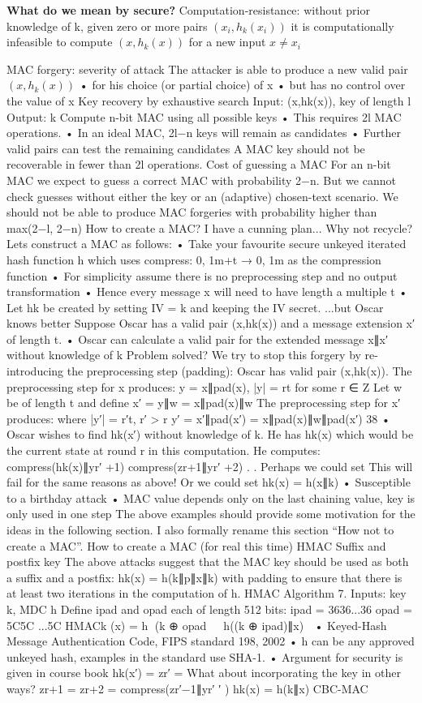 \textbf{What do we mean by secure?}
Computation-resistance:
without prior knowledge of k, given zero or more pairs
$(x_i,h_k(x_i))$ it is computationally infeasible to compute $(x,h_k(x))$ for a new input $x \neq x_i$

MAC forgery: severity of attack
The attacker is able to produce a new valid pair $(x,h_k(x))$
• for his choice (or partial choice) of x
• but has no control over the value of x
Key recovery by exhaustive search
Input: (x,hk(x)), key of length l Output: k
Compute n-bit MAC using all possible keys
• This requires 2l MAC operations.
• In an ideal MAC, 2l−n keys will remain as candidates • Further valid pairs can test the remaining candidates
A MAC key should not be recoverable in fewer than 2l operations. Cost of guessing a MAC
For an n-bit MAC we expect to guess a correct MAC with probability 2−n.
But we cannot check guesses without either the key or an (adaptive) chosen-text scenario.
We should not be able to produce MAC forgeries with probability higher than
max(2−l, 2−n)
How to create a MAC?
I have a cunning plan...
Why not recycle?
Lets construct a MAC as follows:
• Take your favourite secure unkeyed iterated hash function h which uses compress: {0, 1}m+t → {0, 1}m as the compression function
• For simplicity assume there is no preprocessing step and no output transformation
• Hence every message x will need to have length a multiple t
• Let hk be created by setting IV = k and keeping the IV secret.
...but Oscar knows better
Suppose Oscar has a valid pair (x,hk(x)) and a message extension x′ of length t.
• Oscar can calculate a valid pair for the extended message x∥x′ without knowledge of k
Problem solved?
We try to stop this forgery by re-introducing the preprocessing step (padding): Oscar has valid pair (x,hk(x)). The preprocessing step for x produces:
y = x∥pad(x), |y| = rt for some r ∈ Z Let w be of length t and define
x′ = y∥w = x∥pad(x)∥w The preprocessing step for x′ produces:
where |y′| = r′t, r′ > r
y′ = x′∥pad(x′) = x∥pad(x)∥w∥pad(x′) 38
• Oscar wishes to find hk(x′) without knowledge of k. He has hk(x) which would be the current state at round r in this computation. He computes:
compress(hk(x)∥yr′ +1)
compress(zr+1∥yr′ +2) . .
Perhaps we could set
This will fail for the same reasons as above! Or we could set
hk(x) = h(x∥k) • Susceptible to a birthday attack
• MAC value depends only on the last chaining value, key is only used in one step
The above examples should provide some motivation for the ideas in the following section. I
also formally rename this section “How not to create a MAC”.
How to create a MAC (for real this time)
HMAC
Suffix and postfix key
The above attacks suggest that the MAC key should be used as both a suffix and a postfix: hk(x) = h(k∥p∥x∥k)
with padding to ensure that there is at least two iterations in the computation of h. HMAC
Algorithm 7.
Inputs: key k, MDC h
Define ipad and opad each of length 512 bits: ipad = 3636...36
opad = 5C5C ...5C
HMACk (x) = h􏰇 (k ⊕ opad􏰈 􏰎􏰎 h((k ⊕ ipad)∥x) 􏰈
• Keyed-Hash Message Authentication Code, FIPS standard 198, 2002
• h can be any approved unkeyed hash, examples in the standard use SHA-1. • Argument for security is given in course book
hk(x′) = zr′ =
What about incorporating the key in other ways?
zr+1 = zr+2 =
compress(zr′−1∥yr′ ′ ) hk(x) = h(k∥x)
CBC-MAC
